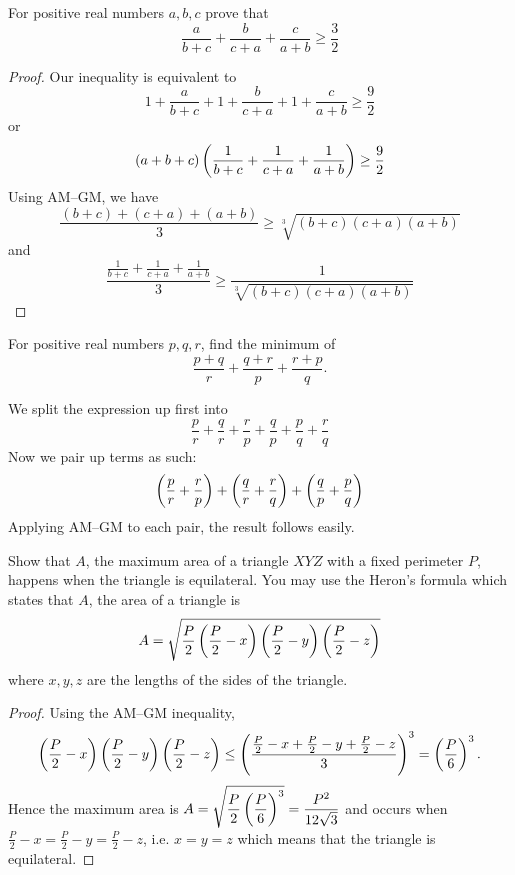 \begin{exercise}
For positive real numbers $a, b, c$ prove that
\[ \frac{a}{b+c}+\frac{b}{c+a}+\frac{c}{a+b} \ge \frac{3}{2} \]
\end{exercise}
\begin{proof}
Our inequality is equivalent to
\[ 1+\frac{a}{b+c}+1+\frac{b}{c+a}+1+\frac{c}{a+b} \ge \frac{9}{2} \]
or 
\[ (a+b+c)\left(\frac{1}{b+c}+\frac{1}{c+a}+\frac{1}{a+b}\right) \ge \frac{9}{2} \]
Using AM--GM, we have
\[ \frac{(b+c)+(c+a)+(a+b)}{3} \ge \sqrt[3]{(b+c)(c+a)(a+b)} \]
and 
\[ \frac{\frac{1}{b+c}+\frac{1}{c+a}+\frac{1}{a+b}}{3} \ge \frac{1}{\sqrt[3]{(b+c)(c+a)(a+b)}} \]
\end{proof}

\begin{exercise}
For positive real numbers $p,q,r$, find the minimum of 
\[ \frac{p+q}{r}+\frac{q+r}{p}+\frac{r+p}{q}. \]
\end{exercise}

\begin{solution}
We split the expression up first into 
\[ \frac{p}{r}+\frac{q}{r}+\frac{r}{p}+\frac{q}{p}+\frac{p}{q}+\frac{r}{q} \]
Now we pair up terms as such:
\[ \left(\frac{p}{r}+\frac{r}{p}\right)+\left(\frac{q}{r}+\frac{r}{q}\right)+\left(\frac{q}{p}+\frac{p}{q}\right) \]
Applying AM--GM to each pair, the result follows easily.
\end{solution}

\begin{exercise}
Show that $A$, the maximum area of a triangle $XYZ$ with a fixed perimeter $P$, happens when the triangle is equilateral. You may use the Heron's formula which states that $A$, the area of a triangle is
\[ A=\sqrt{\frac{P}{2}\left(\frac{P}{2}-x\right)\left(\frac{P}{2}-y\right)\left(\frac{P}{2}-z\right)} \]
where $x,y,z$ are the lengths of the sides of the triangle.
\end{exercise}

\begin{proof}
Using the AM--GM inequality,
\[ \left(\frac{P}{2}-x\right)\left(\frac{P}{2}-y\right)\left(\frac{P}{2}-z\right)\le\left(\frac{\frac{P}{2}-x+\frac{P}{2}-y+\frac{P}{2}-z}{3}\right)^3=\left(\frac{P}{6}\right)^3. \]
Hence the maximum area is $\displaystyle A=\sqrt{\frac{P}{2}\left(\frac{P}{6}\right)^3}=\frac{P^2}{12\sqrt{3}}$ and occurs when $\displaystyle\frac{P}{2}-x=\frac{P}{2}-y=\frac{P}{2}-z$, i.e. $x=y=z$ which means that the triangle is equilateral.
\end{proof}

